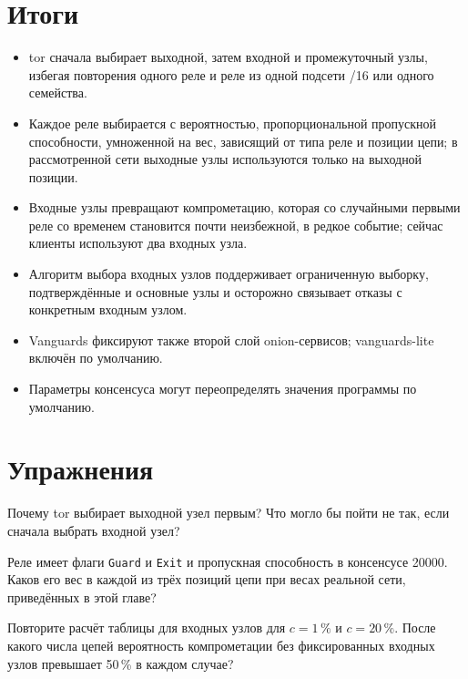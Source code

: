 \section*{Итоги}
\begin{itemize}
  \item tor сначала выбирает выходной, затем входной и промежуточный узлы, избегая повторения одного реле и реле из одной подсети /16 или одного семейства.
  \item Каждое реле выбирается с вероятностью, пропорциональной пропускной способности, умноженной на вес, зависящий от типа реле и позиции цепи; в рассмотренной сети выходные узлы используются только на выходной позиции.
  \item Входные узлы превращают компрометацию, которая со случайными первыми реле со временем становится почти неизбежной, в редкое событие; сейчас клиенты используют два входных узла.
  \item Алгоритм выбора входных узлов поддерживает ограниченную выборку, подтверждённые и основные узлы и осторожно связывает отказы с конкретным входным узлом.
  \item Vanguards фиксируют также второй слой onion-сервисов; vanguards-lite включён по умолчанию.
  \item Параметры консенсуса могут переопределять значения программы по умолчанию.
\end{itemize}

\section*{Упражнения}

\begin{esercizio}[1]\label{es:13-ordine}
Почему tor выбирает выходной узел первым? Что могло бы пойти не так, если сначала выбрать входной узел?
\end{esercizio}

\begin{esercizio}[1]\label{es:13-peso}
Реле имеет флаги \texttt{Guard} и \texttt{Exit} и пропускная способность в консенсусе 20000. Каков его вес в каждой из трёх позиций цепи при весах реальной сети, приведённых в этой главе?
\end{esercizio}

\begin{esercizio}[2]\label{es:13-guard}
Повторите расчёт таблицы для входных узлов для $c = 1\,\%$ и $c = 20\,\%$. После какого числа цепей вероятность компрометации без фиксированных входных узлов превышает 50\,\% в каждом случае?
\end{esercizio}

